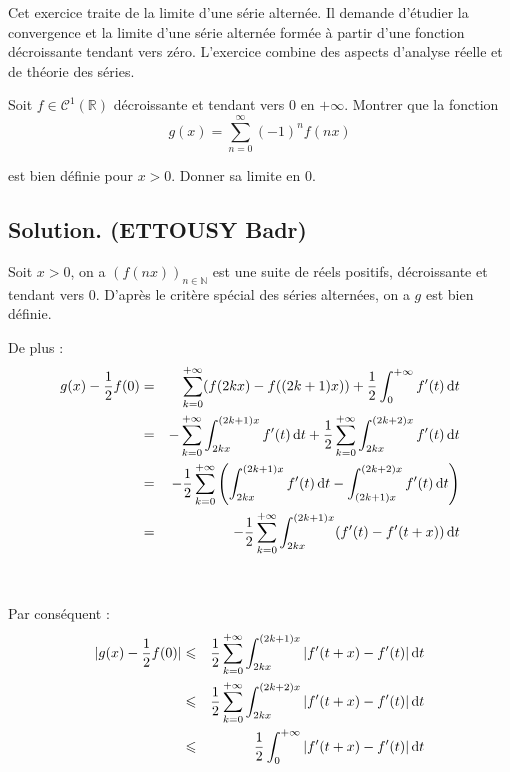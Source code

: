 Cet exercice traite de la limite d'une s{\'e}rie altern{\'e}e. Il demande
d'{\'e}tudier la convergence et la limite d'une s{\'e}rie altern{\'e}e
form{\'e}e {\`a} partir d'une fonction d{\'e}croissante tendant vers z{\'e}ro.
L'exercice combine des aspects d'analyse r{\'e}elle et de th{\'e}orie des
s{\'e}ries.
\begin{exercise}
Soit $f \in \mathcal{C}^1 (\mathbb{R})$ d{\'e}croissante et tendant vers 0 en
$+ \infty$. Montrer que la fonction
\[ g (x) = \sum_{n = 0}^{\infty} (- 1)^n f (nx) \]


est bien d{\'e}finie pour $x > 0$. Donner sa limite en 0.

\end{exercise}
\subsection*{Solution. (ETTOUSY Badr)}


Soit $x > 0$, on a $(f (n x))_{n \in \mathbb{N}}$ est une suite de r{\'e}els
positifs, d{\'e}croissante et tendant vers $0$. D'apr{\`e}s le crit{\`e}re
sp{\'e}cial des s{\'e}ries altern{\'e}es, on a $g$ est bien d{\'e}finie.

De plus :
\begin{eqnarray*}
  g (x) - \frac{1}{2} f (0) & = & \sum_{k = 0}^{+ \infty} (f (2 k x) - f ((2 
  k + 1) x)) + \frac{1}{2}  \int_0^{+ \infty} f' (t) \hspace{0.17em} \text{d}
  t\\
  & = & - \sum_{k = 0}^{+ \infty} \int_{2  kx}^{(2 k + 1) x} f' (t)
  \hspace{0.17em} \text{d} t + \frac{1}{2}  \sum_{k = 0}^{+ \infty} \int_{2 k
  x}^{(2 k + 2) x} f' (t) \hspace{0.17em} \text{d} t\\
  & = & - \frac{1}{2}  \sum_{k = 0}^{+ \infty} \left( \int_{2 kx}^{(2 k + 1)
  x} f' (t) \hspace{0.17em} \text{d} t - \int_{(2 k + 1) x}^{(2 k + 2) x} f'
  (t) \hspace{0.17em} \text{d} t \right)\\
  & = & - \frac{1}{2}  \sum_{k = 0}^{+ \infty} \int_{2 kx}^{(2 k + 1) x} (f'
  (t) - f' (t + x)) \hspace{0.17em} \text{d} t
\end{eqnarray*}


\

Par cons{\'e}quent :
\begin{eqnarray*}
  |g (x) - \frac{1}{2} f (0) | & \leqslant & \frac{1}{2}  \sum_{k = 0}^{+
  \infty} \int_{2 kx}^{(2 k + 1) x} |f' (t + x) - f' (t) | \hspace{0.17em}
  \text{d} t\\
  & \leqslant & \frac{1}{2}  \sum_{k = 0}^{+ \infty} \int_{2 kx}^{(2 k + 2)
  x} |f' (t + x) - f' (t) | \hspace{0.17em} \text{d} t\\
  & \leqslant & \frac{1}{2}  \int_0^{+ \infty} |f' (t + x) - f' (t) |
  \hspace{0.17em} \text{d} t
\end{eqnarray*}


